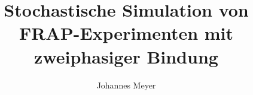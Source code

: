 


	\title{Stochastische Simulation von FRAP-Experimenten mit zweiphasiger Bindung}
	\author{Johannes Meyer}
	
	
	
	
	\tableofcontents
	
	
	
	
	
	
	
	
	
	
	
	
	\appendix
	
	

